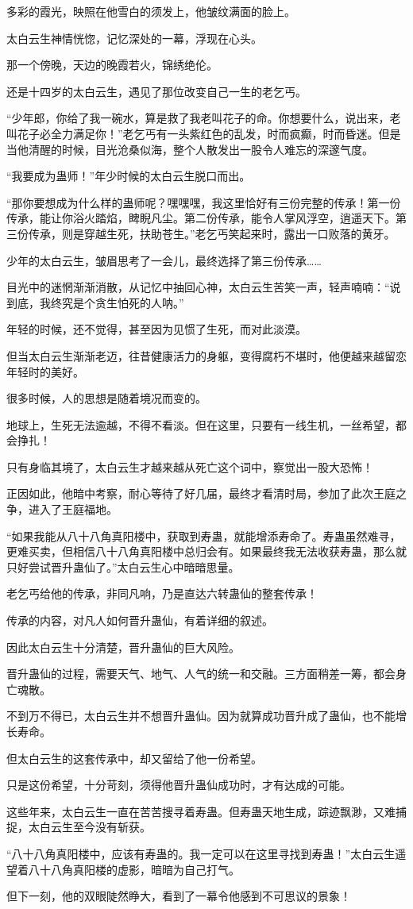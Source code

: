 \begin{this_body}
多彩的霞光，映照在他雪白的须发上，他皱纹满面的脸上。

太白云生神情恍惚，记忆深处的一幕，浮现在心头。

那一个傍晚，天边的晚霞若火，锦绣绝伦。

还是十四岁的太白云生，遇见了那位改变自己一生的老乞丐。

“少年郎，你给了我一碗水，算是救了我老叫花子的命。你想要什么，说出来，老叫花子必全力满足你！”老乞丐有一头紫红色的乱发，时而疯癫，时而昏迷。但是当他清醒的时候，目光沧桑似海，整个人散发出一股令人难忘的深邃气度。

“我要成为蛊师！”年少时候的太白云生脱口而出。

“那你要想成为什么样的蛊师呢？嘿嘿嘿，我这里恰好有三份完整的传承！第一份传承，能让你浴火踏焰，睥睨凡尘。第二份传承，能令人掌风浮空，逍遥天下。第三份传承，则是穿越生死，扶助苍生。”老乞丐笑起来时，露出一口败落的黄牙。

少年的太白云生，皱眉思考了一会儿，最终选择了第三份传承……

目光中的迷惘渐渐消散，从记忆中抽回心神，太白云生苦笑一声，轻声喃喃：“说到底，我终究是个贪生怕死的人呐。”

年轻的时候，还不觉得，甚至因为见惯了生死，而对此淡漠。

但当太白云生渐渐老迈，往昔健康活力的身躯，变得腐朽不堪时，他便越来越留恋年轻时的美好。

很多时候，人的思想是随着境况而变的。

地球上，生死无法逾越，不得不看淡。但在这里，只要有一线生机，一丝希望，都会挣扎！

只有身临其境了，太白云生才越来越从死亡这个词中，察觉出一股大恐怖！

正因如此，他暗中考察，耐心等待了好几届，最终才看清时局，参加了此次王庭之争，进入了王庭福地。

“如果我能从八十八角真阳楼中，获取到寿蛊，就能增添寿命了。寿蛊虽然难寻，更难买卖，但相信八十八角真阳楼中总归会有。如果最终我无法收获寿蛊，那么就只好尝试晋升蛊仙了。”太白云生心中暗暗思量。

老乞丐给他的传承，非同凡响，乃是直达六转蛊仙的整套传承！

传承的内容，对凡人如何晋升蛊仙，有着详细的叙述。

因此太白云生十分清楚，晋升蛊仙的巨大风险。

晋升蛊仙的过程，需要天气、地气、人气的统一和交融。三方面稍差一筹，都会身亡魂散。

不到万不得已，太白云生并不想晋升蛊仙。因为就算成功晋升成了蛊仙，也不能增长寿命。

但太白云生的这套传承中，却又留给了他一份希望。

只是这份希望，十分苛刻，须得他晋升蛊仙成功时，才有达成的可能。

这些年来，太白云生一直在苦苦搜寻着寿蛊。但寿蛊天地生成，踪迹飘渺，又难捕捉，太白云生至今没有斩获。

“八十八角真阳楼中，应该有寿蛊的。我一定可以在这里寻找到寿蛊！”太白云生遥望着八十八角真阳楼的虚影，暗暗为自己打气。

但下一刻，他的双眼陡然睁大，看到了一幕令他感到不可思议的景象！

\end{this_body}

